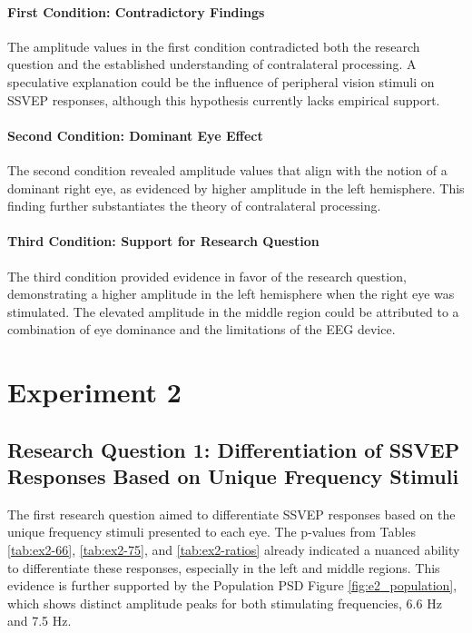 \paragraph{First Condition: Contradictory Findings}
The amplitude values in the first condition contradicted both the research question and the established understanding of contralateral processing. A speculative explanation could be the influence of peripheral vision stimuli on SSVEP responses, although this hypothesis currently lacks empirical support.

\paragraph{Second Condition: Dominant Eye Effect}
The second condition revealed amplitude values that align with the notion of a dominant right eye, as evidenced by higher amplitude in the left hemisphere. This finding further substantiates the theory of contralateral processing.

\paragraph{Third Condition: Support for Research Question}
The third condition provided evidence in favor of the research question, demonstrating a higher amplitude in the left hemisphere when the right eye was stimulated. The elevated amplitude in the middle region could be attributed to a combination of eye dominance and the limitations of the EEG device.



\section{Experiment 2}

\subsection{Research Question 1: Differentiation of SSVEP Responses Based on Unique Frequency Stimuli}

The first research question aimed to differentiate SSVEP responses based on the unique frequency stimuli presented to each eye. The p-values from Tables \ref{tab:ex2-66}, \ref{tab:ex2-75}, and \ref{tab:ex2-ratios} already indicated a nuanced ability to differentiate these responses, especially in the left and middle regions. This evidence is further supported by the Population PSD Figure \ref{fig:e2_population}, which shows distinct amplitude peaks for both stimulating frequencies, 6.6 Hz and 7.5 Hz.

